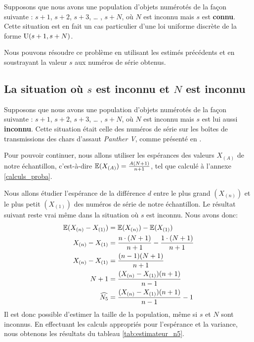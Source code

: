 \documentclass[10pt]{article}
\begin{document}
Supposons que nous avons une population d'objets numérotés de la façon
suivante : \(s+1\), \(s+2\), \(s+3\), \ldots{} , \(s+N\), où \(N\) est
inconnu mais \(s\) est \textbf{connu}. Cette situation est en fait un
cas particulier d'une loi uniforme discrète de la forme
\(\operatorname{U}(s+1,s+N)\).

Nous pouvons résoudre ce problème en utilisant les estimés précédents et
en soustrayant la valeur \(s\) aux numéros de série obtenus.

\hypertarget{la-situation-ou-s-est-inconnu-et-n-est-inconnu}{%
\subsection{\texorpdfstring{La situation où \(s\) est \textbf{inconnu}
et \(N\) est
\textbf{inconnu}}{La situation où s est inconnu et N est inconnu}}\label{la-situation-ou-s-est-inconnu-et-n-est-inconnu}}

Supposons que nous avons une population d'objets numérotés de la façon
suivante : \(s+1\), \(s+2\), \(s+3\), \ldots{} , \(s+N\), où \(N\) est
inconnu mais \(s\) est lui aussi \textbf{inconnu}. Cette situation était
celle des numéros de série sur les boîtes de transmissions des chars
d'assaut \emph{Panther V}, comme présenté en \cite{Ruggles1947}.

Pour pouvoir continuer, nous allons utiliser les espérances des valeurs
\(X_{(A)}\) de notre échantillon, c'est-à-dire
\(\operatorname{\mathbb{E}} (X_{(A)})=\frac{A(N+1)}{n+1}\), tel que calculé à l'annexe
\ref{calculs_proba}.

Nous allons étudier l'espérance de la différence \(d\) entre le plus
grand \((X_{(n)})\) et le plus petit \((X_{(1)})\) des numéros de série
de notre échantillon. Le résultat suivant reste vrai même dans la
situation où \(s\) est inconnu. Nous avons donc: \begin{align*}
\operatorname{\mathbb{E}}(X_{(n)}-X_{(1)}) &= \operatorname{\mathbb{E}}(X_{(n)})-\operatorname{\mathbb{E}}(X_{(1)}) \\
X_{(n)}-X_{(1)} &= \dfrac{n\cdot(N+1)}{n+1}-\dfrac{1\cdot(N+1)}{n+1} \\
X_{(n)}-X_{(1)} &= \dfrac{(n-1)(N+1)}{n+1} \\
N+1 &= \dfrac{(X_{(n)}-X_{(1)})(n+1)}{n-1} \\
\widehat{N_5} &= \dfrac{(X_{(n)}-X_{(1)})(n+1)}{n-1}-1
\end{align*} Il est donc possible d'estimer la taille de la population,
même si \(s\) et \(N\) sont inconnus. En effectuant les calculs
appropriés pour l'espérance et la variance, nous obtenons les résultats
du tableau \ref{tab:estimateur_n5}.
\end{document}
